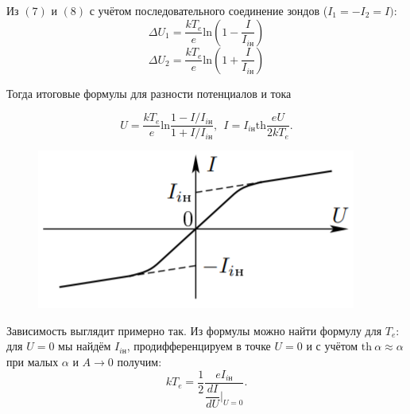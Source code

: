 \documentclass{lab}
\begin{document}
Из $(7)$ и $(8)$ с учётом последовательного соединение зондов ($I_1 = -I_2 = I)$:
$$
\Delta U_1= \dfrac{kT_e}{e}\text{ln}\left(1 - \dfrac{I}{I_{i\text{н}}}\right)
$$
$$
\Delta U_2= \dfrac{kT_e}{e}\text{ln}\left(1 + \dfrac{I}{I_{i\text{н}}}\right)
$$

Тогда итоговые формулы для разности потенциалов и тока

\begin{equation}
    U = \dfrac{kT_e}{e}\text{ln}\dfrac{1 - I/I_{i\text{н}}}{1 + I/I_{i\text{н}}}, \ \
    I = I_{i\text{н}} \text{th}\dfrac{eU}{2kT_e}.
\end{equation}

\begin{figure}
    \includegraphics[scale=0.8]{4.png}
\end{figure}
Зависимость выглядит примерно так.
Из формулы можно найти формулу для $T_e$: для $U=0$ мы найдём $I_{i\text{н}}$, продифференцируем в точке $U=0$ и с учётом $\text{th}~\alpha \approx \alpha$ при малых $\alpha$ и $A\rightarrow 0$ получим:
\begin{equation}
    kT_e = \dfrac{1}{2}\dfrac{eI_{i\text{н}}}{\dfrac{dI}{dU}|_{U=0}}.
\end{equation}
\end{document}
